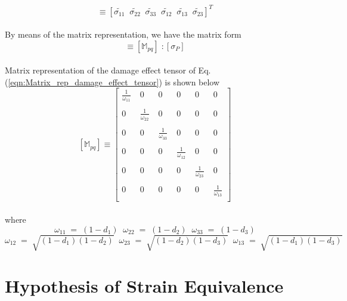 \documentclass[a4paper,12pt,twoside]{report}
\begin{document}
\begin{equation}
   [\tilde{\sigma_{P}}]  \equiv  [\tilde{\sigma_{11}} \;\; \tilde{\sigma_{22}} \;\;\tilde{\sigma_{33}} \;\;\tilde{\sigma_{12}} \;\;\tilde{\sigma_{13}} \;\;\tilde{\sigma_{23}} ]^{T}
\end{equation}
\\
By means of the matrix representation, we have the matrix form
\begin{equation}
[\tilde{\sigma_{P}}] \equiv [\mathbb{M}_{pq}]\;: [\sigma_{P}]
\label{eqn:Matrix_rep_damage_effect_tensor}
\end{equation}
\\
Matrix representation of the damage effect tensor of Eq.(\ref{eqn:Matrix_rep_damage_effect_tensor}) is shown below
\\
$$
[\mathbb{M}_{pq}] \equiv   
 \begin{bmatrix}
   \frac{1}{\omega_{11}}  \; & 0 \; & 0 \; & 0 \; & 0\; & 0 \\
  \\
  0\; & \frac{1}{\omega_{22}}\; & 0\; & 0\; & 0\; & 0 \\
  \\
  0\; & 0 \; & \frac{1}{\omega_{33}}\; & 0\; & 0\; & 0 \\
  \\
  0\; & 0\; & 0\; & \frac{1}{\omega_{12}}\; & 0\; & 0 \\
  \\
  0\; & 0\; & 0\; & 0\; & \frac{1}{\omega_{23}}\; & 0 \\
  \\
  0\; & 0\; & 0\; & 0\; & 0\; & \frac{1}{\omega_{13}}  
  \\
 \end{bmatrix}
 \label{Damage_effect_tensor}
 $$
\\
where
$$\omega_{11} \; = \; (1 - d_{1}) \;\;  \omega_{22} \; = \; (1 - d_{2}) \;\; \omega_{33} \; = \; (1 - d_{3})$$ \vspace*{0.1cm} $$\omega_{12} \; = \; \sqrt{(1 - d_{1})(1 - d_{2})}  \;\;\omega_{23} \; = \; \sqrt{(1 - d_{2})(1 - d_{3})} \;\; \omega_{13} \; = \; \sqrt{(1 - d_{1})(1 - d_{3})}$$

\section{Hypothesis of Strain Equivalence}\label{Hypothesis of Strain Equivalence}
\end{document}
